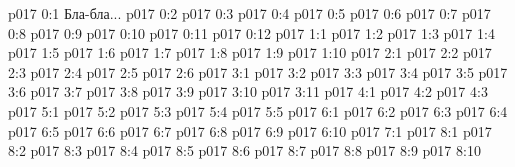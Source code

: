 \author{Божественный Советник}
\vs p017 0:1  Бла-бла...
\vs p017 0:2 
\vs p017 0:3 
\vs p017 0:4 
\vs p017 0:5 \pc 
\vs p017 0:6 
\vs p017 0:7 
\vs p017 0:8 
\vs p017 0:9 
\vs p017 0:10 \pc 
\vs p017 0:11 
\vs p017 0:12 
\vs p017 1:1 
\vs p017 1:2 
\vs p017 1:3 \pc 
\vs p017 1:4 
\vs p017 1:5 
\vs p017 1:6 
\vs p017 1:7 
\vs p017 1:8 
\vs p017 1:9 \pc 
\vs p017 1:10 
\vs p017 2:1 
\vs p017 2:2 
\vs p017 2:3 
\vs p017 2:4 
\vs p017 2:5 \pc 
\vs p017 2:6 
\vs p017 3:1 
\vs p017 3:2 
\vs p017 3:3 
\vs p017 3:4 
\vs p017 3:5 \pc 
\vs p017 3:6 
\vs p017 3:7 
\vs p017 3:8 
\vs p017 3:9 
\vs p017 3:10 \pc 
\vs p017 3:11 
\vs p017 4:1 
\vs p017 4:2 
\vs p017 4:3 
\vs p017 5:1 
\vs p017 5:2 
\vs p017 5:3 
\vs p017 5:4 
\vs p017 5:5 
\vs p017 6:1 
\vs p017 6:2 \pc 
\vs p017 6:3 
\vs p017 6:4 
\vs p017 6:5 
\vs p017 6:6 
\vs p017 6:7 
\vs p017 6:8 
\vs p017 6:9 
\vs p017 6:10 
\vs p017 7:1 
\vs p017 8:1 
\vs p017 8:2 \pc 
\vs p017 8:3 \pc 
\vs p017 8:4 
\vs p017 8:5 
\vs p017 8:6 
\vs p017 8:7 
\vs p017 8:8 
\vs p017 8:9 \pc 
\vsetoff
\vs p017 8:10 
\quizlink
